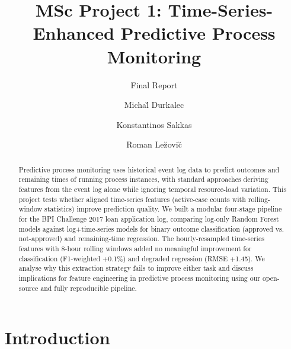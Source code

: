 \documentclass[runningheads]{llncs}
\begin{document}
\title{MSc Project 1: Time-Series-Enhanced Predictive Process Monitoring}
\subtitle{Final Report}

\author{Micha\u{l} Durkalec \and
    Konstantinos Sakkas \and
    Roman Le\u{z}ovi\u{c}
}


\maketitle

\begin{abstract}

Predictive process monitoring uses historical event log data to predict
outcomes and remaining times of running process instances, with standard
approaches deriving features from the event log alone while ignoring
temporal resource-load variation. This project tests whether aligned
time-series features (active-case counts with rolling-window statistics)
improve prediction quality. We built a modular four-stage pipeline for the
BPI Challenge 2017 loan application log, comparing log-only Random Forest
models against log+time-series models for binary outcome classification
(approved vs. not-approved) and remaining-time regression. The hourly-resampled
time-series features with 8-hour rolling windows added no meaningful improvement
for classification (F1-weighted +0.1\%) and degraded regression
(RMSE +1.45). We
analyse why this extraction strategy fails to improve either task and
discuss implications for feature engineering in predictive process monitoring
using our open-source and fully reproducible pipeline.

\end{abstract}

\section{Introduction}
\label{sec:introduction}
\end{document}
